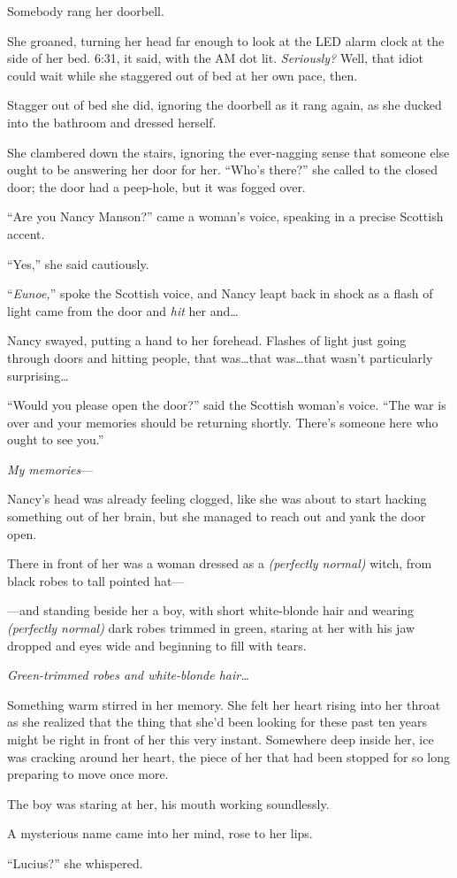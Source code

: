 Somebody rang her doorbell.

She groaned, turning her head far enough to look at the LED alarm clock at the side of her bed. 6:31, it said, with the AM dot lit. \emph{Seriously?} Well, that idiot could wait while she staggered out of bed at her own pace, then.

Stagger out of bed she did, ignoring the doorbell as it rang again, as she ducked into the bathroom and dressed herself.

She clambered down the stairs, ignoring the ever-nagging sense that someone else ought to be answering her door for her. “Who’s there?” she called to the closed door; the door had a peep-hole, but it was fogged over.

“Are you Nancy Manson?” came a woman’s voice, speaking in a precise Scottish accent.

“Yes,” she said cautiously.

“\emph{Eunoe,}” spoke the Scottish voice, and Nancy leapt back in shock as a flash of light came from the door and \emph{hit} her and…

Nancy swayed, putting a hand to her forehead. Flashes of light just going through doors and hitting people, that was…that was…that wasn’t particularly surprising…

“Would you please open the door?” said the Scottish woman’s voice. “The war is over and your memories should be returning shortly. There’s someone here who ought to see you.”

\emph{My memories}—

Nancy’s head was already feeling clogged, like she was about to start hacking something out of her brain, but she managed to reach out and yank the door open.

There in front of her was a woman dressed as a \emph{(perfectly normal)} witch, from black robes to tall pointed hat—

—and standing beside her a boy, with short white-blonde hair and wearing \emph{(perfectly normal)} dark robes trimmed in green, staring at her with his jaw dropped and eyes wide and beginning to fill with tears.

\emph{Green-trimmed robes and white-blonde hair…}

Something warm stirred in her memory. She felt her heart rising into her throat as she realized that the thing that she’d been looking for these past ten years might be right in front of her this very instant. Somewhere deep inside her, ice was cracking around her heart, the piece of her that had been stopped for so long preparing to move once more.

The boy was staring at her, his mouth working soundlessly.

A mysterious name came into her mind, rose to her lips.

“Lucius?” she whispered.

